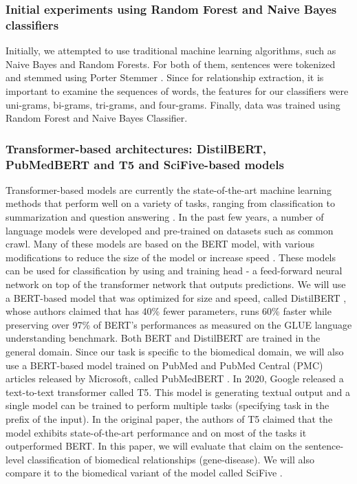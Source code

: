 \documentclass[final,12pt,3p,times,twocolumn,authoryear]{elsarticle}
\begin{document}
\subsubsection{Initial experiments using Random Forest and Naive Bayes classifiers}

Initially, we attempted to use traditional machine learning algorithms, such as Naive Bayes and Random Forests. For both of them, sentences were tokenized and stemmed using Porter Stemmer \citep{porter1980algorithm}. Since for relationship extraction, it is important to examine the sequences of words, the features for our classifiers were uni-grams, bi-grams, tri-grams, and four-grams. Finally, data was trained using Random Forest and Naive Bayes Classifier. 


\subsubsection{Transformer-based architectures: DistilBERT, PubMedBERT and T5 and SciFive-based models}

Transformer-based models are currently the state-of-the-art machine learning methods that perform well on a variety of tasks, ranging from classification to summarization and question answering \citep{devlin2018bert,raffel2020exploring}. In the past few years, a number of language models were developed and pre-trained on datasets such as common crawl. Many of these models are based on the BERT model, with various modifications to reduce the size of the model or increase speed \citep{sanh2019distilbert,liu2019roberta,lan2019albert}. These models can be used for classification by using and training head - a feed-forward neural network on top of the transformer network that outputs predictions. We will use a BERT-based model that was optimized for size and speed, called DistilBERT \citep{sanh2019distilbert}, whose authors claimed that has 40\% fewer parameters, runs 60\% faster while preserving over 97\% of BERT's performances as measured on the GLUE language understanding benchmark. Both BERT and DistilBERT are trained in the general domain. Since our task is specific to the biomedical domain, we will also use a BERT-based model trained on PubMed and PubMed Central (PMC) articles released by Microsoft, called PubMedBERT \citep{gu2021domain}. In 2020, Google released a text-to-text transformer called T5. This model is generating textual output and a single model can be trained to perform multiple tasks (specifying task in the prefix of the input). In the original paper, the authors of T5 claimed that the model exhibits state-of-the-art performance and on most of the tasks it outperformed BERT. In this paper, we will evaluate that claim on the sentence-level classification of biomedical relationships (gene-disease). We will also compare it to the biomedical variant of the model called SciFive \citep{phan2021scifive}.
\end{document}
